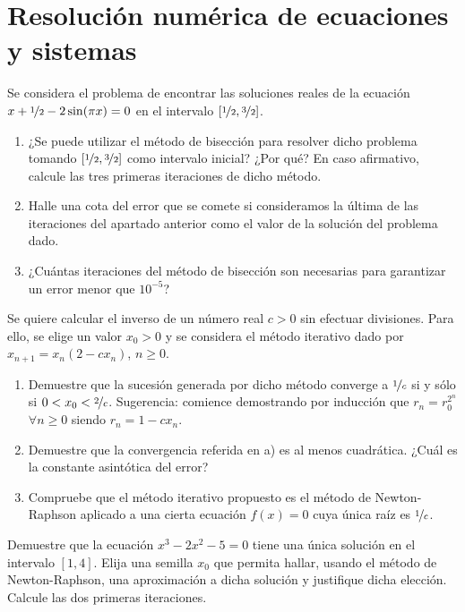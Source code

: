 \section{Resolución numérica de ecuaciones y sistemas}

\begin{ejercicio}\label{ej:1.1}
    Se considera el problema de encontrar las soluciones reales de la ecuación $x + \nicefrac{1}{2} - 2\sin(\pi x) = 0$ en el intervalo $\left[\nicefrac{1}{2},\nicefrac{3}{2}\right]$.
    \begin{enumerate}
        \item ¿Se puede utilizar el método de bisección para resolver dicho problema tomando $\left[\nicefrac{1}{2},\nicefrac{3}{2}\right]$ como intervalo inicial? ¿Por qué? En caso afirmativo, calcule las tres primeras iteraciones de dicho método.
        \item Halle una cota del error que se comete si consideramos la última de las iteraciones del apartado anterior como el valor de la solución del problema dado.
        \item ¿Cuántas iteraciones del método de bisección son necesarias para garantizar un error menor que $10^{-5}$?
    \end{enumerate}
\end{ejercicio}

\begin{ejercicio}\label{ej:1.2}
    Se quiere calcular el inverso de un número real $c > 0$ sin efectuar divisiones. Para ello, se elige un valor $x_0 > 0$ y se considera el método iterativo dado por $x_{n+1} = x_n(2 - cx_n)$, $n \geq 0$.
    \begin{enumerate}
        \item Demuestre que la sucesión generada por dicho método converge a $\nicefrac{1}{c}$ si y sólo si $0 < x_0 < \nicefrac{2}{c}$. Sugerencia: comience demostrando por inducción que $r_n = r^{2^n}_0$ $\forall n \geq 0$ siendo $r_n = 1 - cx_n$.
        \item Demuestre que la convergencia referida en a) es al menos cuadrática. ¿Cuál es la constante asintótica del error?
        \item Compruebe que el método iterativo propuesto es el método de Newton-Raphson aplicado a una cierta ecuación $f(x) = 0$ cuya única raíz es $\nicefrac{1}{c}$.
    \end{enumerate}
\end{ejercicio}


\begin{ejercicio}\label{ej:1.3}
    Demuestre que la ecuación $x^3 - 2x^2 - 5 = 0$ tiene una única solución en el intervalo $[1, 4]$. Elija una semilla $x_0$ que permita hallar, usando el método de Newton-Raphson, una aproximación a dicha solución y justifique dicha elección. Calcule las dos primeras iteraciones.
\end{ejercicio}


